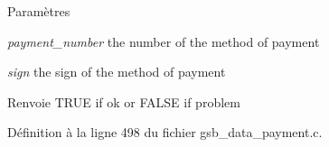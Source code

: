 \begin{DoxyParams}{Paramètres}
\item[{\em payment\_\-number}]the number of the method of payment \item[{\em sign}]the sign of the method of payment\end{DoxyParams}
\begin{DoxyReturn}{Renvoie}
TRUE if ok or FALSE if problem 
\end{DoxyReturn}


Définition à la ligne 498 du fichier gsb\_\-data\_\-payment.c.


